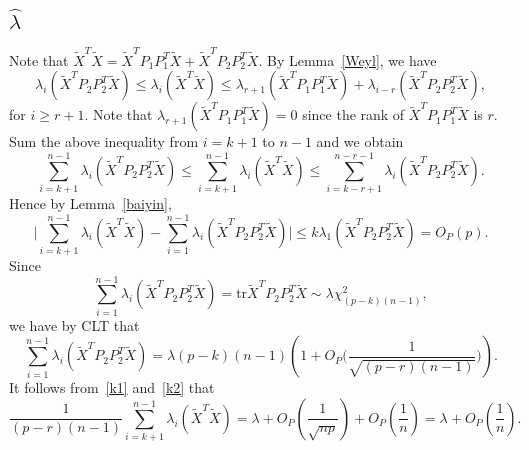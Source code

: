 \documentclass[review]{elsarticle}
\theoremstyle{plain}
\theoremstyle{definition}
\theoremstyle{remark}
\begin{document}
\subsection{$\hat{\lambda}$}
Note that $\tilde{X}^T\tilde{X}=\tilde{X}^T P_1 P_1^T\tilde{X}+\tilde{X}^T P_2 P_2^T\tilde{X}$.
By Lemma~\ref{Weyl}, we have
\begin{equation}
     \lambda_{i} (\tilde{X}^T P_2 P_2^T\tilde{X})
    \leq \lambda_{i} (\tilde{X}^T\tilde{X})
    \leq \lambda_{r+1} (\tilde{X}^T P_1 P_1^T\tilde{X})
    + \lambda_{i-r} (\tilde{X}^T P_2 P_2^T\tilde{X}),
\end{equation}
for $i\geq r+1$. Note that $ \lambda_{r+1} (\tilde{X}^T P_1 P_1^T\tilde{X})=0$ since the rank of $\tilde{X}^T P_1 P_1^T\tilde{X}$ is $r$. Sum the above inequality from $i=k+1$ to $n-1$ and we obtain
\begin{equation}
    \sum_{i=k+1}^{n-1}\lambda_{i} (\tilde{X}^T P_2 P_2^T\tilde{X})
    \leq \sum_{i=k+1}^{n-1}\lambda_{i} (\tilde{X}^T\tilde{X})
    \leq \sum_{i=k-r+1}^{n-r-1} \lambda_{i} (\tilde{X}^T P_2 P_2^T\tilde{X}).
\end{equation}
Hence by Lemma~\ref{baiyin},
\begin{equation}\label{k1}
     \big|\sum_{i=k+1}^{n-1}\lambda_{i} (\tilde{X}^T\tilde{X})
    - \sum_{i=1}^{n-1} \lambda_{i} (\tilde{X}^T P_2 P_2^T\tilde{X})\big|\leq k \lambda_1(\tilde{X}^T P_2 P_2^T\tilde{X})= O_P(p).
\end{equation}
Since 
\begin{equation}
   \sum_{i=1}^{n-1} \lambda_{i} (\tilde{X}^T P_2 P_2^T\tilde{X})= \textrm{tr}\tilde{X}^T P_2 P_2^T \tilde{X}\sim \lambda \chi^2_{(p-k)(n-1)},
\end{equation}
we have by CLT that
\begin{equation}\label{k2}
    \sum_{i=1}^{n-1} \lambda_{i} (\tilde{X}^T P_2 P_2^T\tilde{X})=\lambda{(p-k)(n-1)}(1+O_P\big(\frac{1}{\sqrt{(p-r)(n-1)}}\big)).
\end{equation}
It follows from~\eqref{k1} and~\eqref{k2} that
\begin{equation}
    \frac{1}{(p-r)(n-1)}\sum_{i=k+1}^{n-1}\lambda_{i} (\tilde{X}^T\tilde{X})=\lambda+O_P(\frac{1}{\sqrt{np}})+O_P(\frac{1}{n})=\lambda+O_P(\frac{1}{n}).
\end{equation}
\end{document}

